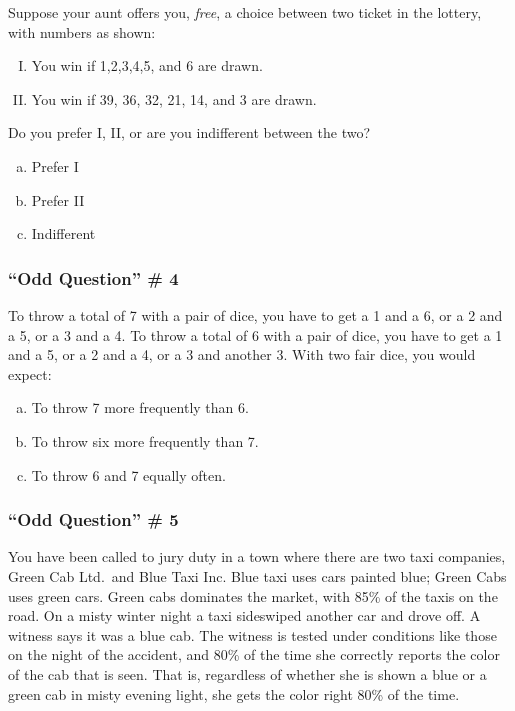 \documentclass[handout]{beamer}
\begin{document}
\begin{singlespace}
\begin{frame}
	Suppose your aunt offers you, \emph{free}, a choice between two ticket in the lottery, with numbers as shown:
		\begin{enumerate}[I.]
			\item You win if 1,2,3,4,5, and 6 are drawn.
			\item You win if 39, 36, 32, 21, 14, and 3 are drawn.
		\end{enumerate}
		\vspace{1em}
		Do you prefer I, II, or are you indifferent between the two?
		\begin{enumerate}[(a)]
			\item Prefer I
			\item Prefer II
			\item Indifferent
		\end{enumerate}
\end{frame}
\begin{frame}
\frametitle{``Odd Question'' \# 4}
To throw a total of 7 with a pair of dice, you have to get a 1 and a 6, or a 2 and a 5, or a 3 and a 4.
To throw a total of 6 with a pair of dice, you have to get a 1 and a 5, or a 2 and a 4, or a 3 and another 3.
	\vspace{1em}
	With two fair dice, you would expect:
		\begin{enumerate}[(a)]
			\item To throw 7 more frequently than 6.
			\item To throw six more frequently than 7.
			\item To throw 6 and 7 equally often.
		\end{enumerate}
\end{frame}
\begin{frame}
\frametitle{``Odd Question'' \# 5}
\small
You have been called to jury duty in a town where there are two taxi companies, Green Cab Ltd.\ and Blue Taxi Inc. Blue taxi uses cars painted blue; Green Cabs uses green cars. Green cabs dominates the market, with 85\% of the taxis on the road. On a misty winter night a taxi sideswiped another car and drove off. A witness says it was a blue cab. The witness is tested under conditions like those on the night of the accident, and 80\% of the time she correctly reports the color of the cab that is seen. That is, regardless of whether she is shown a blue or a green cab in misty evening light, she gets the color right 80\% of the time.
	\vspace{1em}
	

\end{frame}
\end{singlespace}
\end{document}
